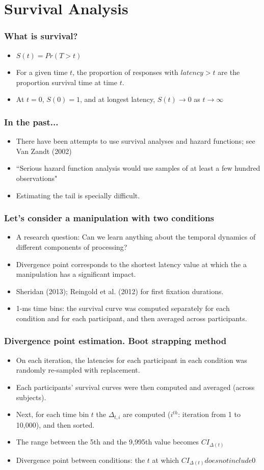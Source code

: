 \documentclass{beamer}
\begin{document}
\section{Survival Analysis}
{
  	\frame
  	{
     		\frametitle{What is survival?}
		
		\begin{itemize}
			\item $S(t)=Pr(T>t)$
			\item For a given time $t$, the proportion of responses with $latency > t$ are the proportion survival time at time $t$.
			\item At $t=0$, $S(0)=1$, and at longest latency, $S(t) \to 0 $ as $t \to \infty$
    		\end{itemize}
  	}


	\frame
	{
	\frametitle{In the past...}
	\begin{itemize}
		\item There have been attempts to use survival analyses and hazard functions;  see Van Zandt (2002)
		\item ``Serious hazard function analysis  would use samples of at least a few hundred observations"
		\item Estimating the tail is specially difficult. 
	\end{itemize}
	}
	
	
	\frame
	{
	\frametitle{Let's consider a manipulation with two conditions}
	\begin{itemize}
		\item <1-> A research question: Can we learn anything about the temporal dynamics of different components of processing?
		\item <2-> Divergence point corresponds to the shortest latency value at which the a manipulation has a significant impact.
		\item <3-> Sheridan (2013); Reingold et al. (2012) for first fixation durations.
		\item <3->  1-ms time bins: the survival curve was computed separately for each condition and for each participant, and then averaged across participants.
	\end{itemize}
	}
	

	
	\frame
	{
	\frametitle{Divergence point estimation. Boot strapping method}
	\begin{itemize}
		\item <1-> On each iteration, the latencies for each participant in each condition was randomly re-sampled with replacement.
		\item <2-> Each participants' survival curves were then computed and averaged (across subjects). 
		\item <3-> Next, for each time bin $t$ the $\Delta_{t,i}$ are computed ($i^{th}$: iteration from 1 to 10,000), and then sorted.
		\item <4-> The range between the 5th and the 9,995th value becomes $CI_{\Delta(t)}$ 
		\item <5-> Divergence point between conditions:  the $t$ at which $CI_{\Delta(t)} does not include 0$ 
	\end{itemize}
	}


}
\end{document}
